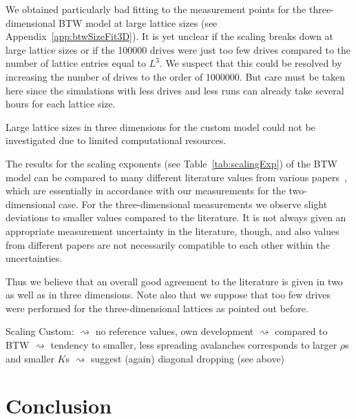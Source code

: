 We obtained particularly bad fitting to the measurement points for the three-dimensional BTW model at large lattice
sizes (see Appendix~\ref{app:btwSizeFit3D}). It is yet unclear if the scaling breaks down at large lattice sizes or
if the \num{100000} drives were just too few drives compared to the number of lattice entries equal to $L^3$.
We suspect that this could be resolved by increasing the number of drives to the order of \num{1000000}.
But care must be taken here since the simulations with less drives and less runs can already take several hours
for each lattice size.

Large lattice sizes in three dimensions for the custom model could not be investigated due to limited computational
resources.

The results for the scaling exponents (see Table~\ref{tab:scalingExp}) of the BTW model can be compared to many
different literature values from various papers~\cite{SOC-book}, which are essentially in accordance with our
measurements for the two-dimensional case. For the three-dimensional measurements we observe slight deviations to
smaller values compared to the literature. It is not always given an appropriate measurement uncertainty in the
literature, though, and also values from different papers are not necessarily compatible to each other within the
uncertainties.

Thus we believe that an overall good agreement to the literature is given in two as well as in three dimensions.
Note also that we suppose that too few drives were performed for the three-dimensional lattices as pointed out before.


Scaling Custom:
$\rightsquigarrow$ no reference values, own development
$\rightsquigarrow$ compared to BTW $\rightsquigarrow$ tendency to smaller, less spreading avalanches corresponds to
                   larger $\rho$s and smaller $K$s \checkmark $\rightsquigarrow$ suggest (again) diagonal dropping
                   (see above)


\section{Conclusion}
\label{sec:conclusion}

